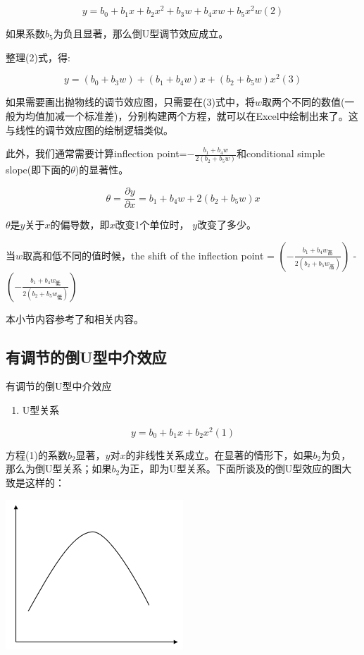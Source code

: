 \documentclass[
]{book}
\providecommand{\tightlist}{%
  \setlength{\itemsep}{0pt}\setlength{\parskip}{0pt}}
\begin{document}
\[
y=b_{0}+b_{1}x+b_{2}x^{2}+b_{3}w+b_{4}xw+b_{5}x^{2}w(2)
\]

如果系数\(b_{5}\)为负且显著，那么倒U型调节效应成立。

整理(2)式，得:

\[
y=(b_{0}+b_{3}w)+(b_{1}+b_{4}w)x+(b_{2}+b_{5}w)x^{2}(3)
\]

如果需要画出抛物线的调节效应图，只需要在(3)式中，将\(w\)取两个不同的数值(一般为均值加减一个标准差)，分别构建两个方程，就可以在Excel中绘制出来了。这与线性的调节效应图的绘制逻辑类似。

此外，我们通常需要计算inflection point=\(-\frac{b_{1}+b_{4}w}{2(b_{2}+b_{5}w)}\)和conditional simple slope(即下面的\(\theta\))的显著性。

\[
\theta=\frac{\partial y}{\partial x}=b_{1}+b_{4}w+2(b_{2}+b_{5}w)x
\]

\(\theta\)是\(y\)关于\(x\)的偏导数，即\(x\)改变1个单位时， \(y\)改变了多少。

当\(w\)取高和低不同的值时候，the shift of the inflection point = \((-\frac{b_{1}+b_{4}w_{高}}{2(b_{2}+b_{5}w_{高})})\) - \((-\frac{b_{1}+b_{4}w_{低}}{2(b_{2}+b_{5}w_{低})})\)

本小节内容参考了\autocite{Lin2017:RNG}和\autocite{Hu2019:RNG}相关内容。

\hypertarget{ux6709ux8c03ux8282ux7684ux5012uux578bux4e2dux4ecbux6548ux5e94}{%
\subsection{有调节的倒U型中介效应}\label{ux6709ux8c03ux8282ux7684ux5012uux578bux4e2dux4ecbux6548ux5e94}}

有调节的倒U型中介效应

\begin{enumerate}
\def\labelenumi{\arabic{enumi}.}
\tightlist
\item
  U型关系
\end{enumerate}

\[
y=b_{0}+b_{1}x+b_{2}x^{2}(1)
\]

方程(1)的系数\(b_{2}\)显著，\(y\)对\(x\)的非线性关系成立。在显著的情形下，如果\(b_{2}\)为负，那么为倒U型关系；如果\(b_{2}\)为正，即为U型关系。下面所谈及的倒U型效应的图大致是这样的：

\includegraphics{figs/1221.png}
\end{document}

